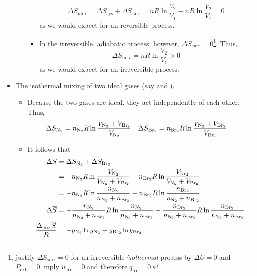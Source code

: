 \documentclass[../notes.tex]{subfiles}
\begin{document}
\begin{itemize}
\begin{itemize}
\begin{itemize}
\begin{equation*}
                \Delta S_\text{univ} = \Delta S_\text{sys}+\Delta S_\text{surr}
                = nR\ln\frac{V_2}{V_1}-nR\ln\frac{V_2}{V_1}
                = 0
            \end{equation*}
            as we would expect for an reversible process.
            \item In the irreversible, adiabatic process, however, $\Delta S_\text{surr}=0$\footnote{\textcite{bib:McQuarrieSimon} justify $\Delta S_\text{surr}=0$ for an irreversible \emph{isothermal} process by $\Delta U=0$ and $P_\text{ext}=0$ imply $w_\text{irr}=0$ and therefore $q_\text{irr}=0$.}. Thus,
            \begin{equation*}
                \Delta S_\text{univ} = nR\ln\frac{V_2}{V_1}
                > 0
            \end{equation*}
            as we would expect for an irreversible process.
        \end{itemize}
    \end{itemize}
    \item The isothermal mixing of two ideal gases (say  and ).
    \begin{itemize}
        \item Because the two gases are ideal, they act independently of each other. Thus,
        \begin{align*}
            \Delta S_{\ce{N2}} &= n_{\ce{N2}}R\ln\frac{V_{\ce{N2}}+V_{\ce{Br2}}}{V_{\ce{N2}}}&
            \Delta S_{\ce{Br2}} &= n_{\ce{Br2}}R\ln\frac{V_{\ce{N2}}+V_{\ce{Br2}}}{V_{\ce{Br2}}}
        \end{align*}
        \item It follows that
        \begin{align*}
            \Delta S &= \Delta S_{\ce{N2}}+\Delta S_{\ce{Br2}}\\
            &= -n_{\ce{N2}}R\ln\frac{V_{\ce{N2}}}{V_{\ce{N2}}+V_{\ce{Br2}}}-n_{\ce{Br2}}R\ln\frac{V_{\ce{Br2}}}{V_{\ce{N2}}+V_{\ce{Br2}}}\\
            &= -n_{\ce{N2}}R\ln\frac{n_{\ce{N2}}}{n_{\ce{N2}}+n_{\ce{Br2}}}-n_{\ce{Br2}}R\ln\frac{n_{\ce{Br2}}}{n_{\ce{N2}}+n_{\ce{Br2}}}\\
            \Delta\overline{S} &= -\frac{n_{\ce{N2}}}{n_{\ce{N2}}+n_{\ce{Br2}}}R\ln\frac{n_{\ce{N2}}}{n_{\ce{N2}}+n_{\ce{Br2}}}-\frac{n_{\ce{Br2}}}{n_{\ce{N2}}+n_{\ce{Br2}}}R\ln\frac{n_{\ce{Br2}}}{n_{\ce{N2}}+n_{\ce{Br2}}}\\
            \frac{\Delta_\text{mix}\overline{S}}{R} &= -y_{\ce{N2}}\ln y_{\ce{N2}}-y_{\ce{Br2}}\ln y_{\ce{Br2}}

\end{align*}
\end{itemize}
\end{itemize}
\end{document}
